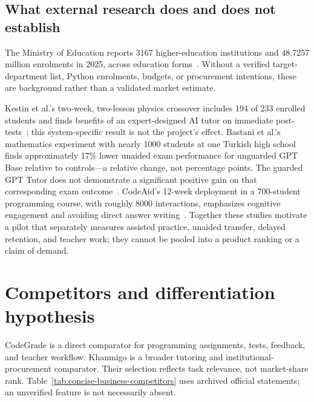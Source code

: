 \subsection{What external research does and does not establish}
The Ministry of Education reports 3167 higher-education institutions and 48.7257 million enrolments in 2025, across education forms~\cite{businessmoe}. Without a verified target-department list, Python enrolments, budgets, or procurement intentions, these are background rather than a validated market estimate.

Kestin et al.'s two-week, two-lesson physics crossover includes 194 of 233 enrolled students and finds benefits of an expert-designed AI tutor on immediate post-tests~\cite{businesskestin}; this system-specific result is not the project's effect. Bastani et al.'s mathematics experiment with nearly 1000 students at one Turkish high school finds approximately 17\% lower unaided exam performance for unguarded GPT Base relative to controls---a relative change, not percentage points. The guarded GPT Tutor does not demonstrate a significant positive gain on that corresponding exam outcome~\cite{businessbastani}. CodeAid's 12-week deployment in a 700-student programming course, with roughly 8000 interactions, emphasizes cognitive engagement and avoiding direct answer writing~\cite{businesscodeaid}. Together these studies motivate a pilot that separately measures assisted practice, unaided transfer, delayed retention, and teacher work; they cannot be pooled into a product ranking or a claim of demand.

\section{Competitors and differentiation hypothesis}
CodeGrade is a direct comparator for programming assignments, tests, feedback, and teacher workflow. Khanmigo is a broader tutoring and institutional-procurement comparator. Their selection reflects task relevance, not market-share rank. Table~\ref{tab:concise-business-competitors} uses archived official statements; an unverified feature is not necessarily absent.


